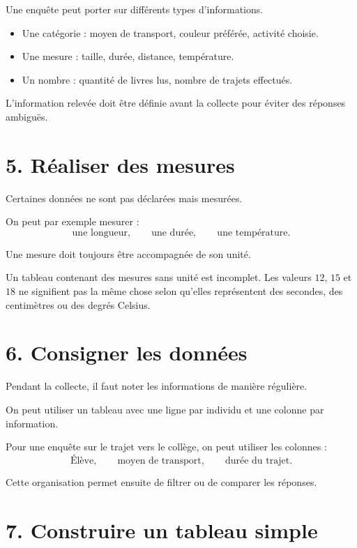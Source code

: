 Une enquête peut porter sur différents types d'informations.

\begin{itemize}
\item Une catégorie : moyen de transport, couleur préférée, activité choisie.
\item Une mesure : taille, durée, distance, température.
\item Un nombre : quantité de livres lus, nombre de trajets effectués.
\end{itemize}

L'information relevée doit être définie avant la collecte pour éviter des réponses ambiguës.

\section{5. Réaliser des mesures}

Certaines données ne sont pas déclarées mais mesurées.

On peut par exemple mesurer :
\[
\text{une longueur},\qquad
\text{une durée},\qquad
\text{une température}.
\]

Une mesure doit toujours être accompagnée de son unité.

\begin{attention}
Un tableau contenant des mesures sans unité est incomplet. Les valeurs $12$, $15$ et $18$ ne signifient pas la même chose selon qu'elles représentent des secondes, des centimètres ou des degrés Celsius.
\end{attention}

\section{6. Consigner les données}

Pendant la collecte, il faut noter les informations de manière régulière.

On peut utiliser un tableau avec une ligne par individu et une colonne par information.

\begin{exemple}
Pour une enquête sur le trajet vers le collège, on peut utiliser les colonnes :
\[
\text{Élève},\qquad
\text{moyen de transport},\qquad
\text{durée du trajet}.
\]

Cette organisation permet ensuite de filtrer ou de comparer les réponses.
\end{exemple}

\section{7. Construire un tableau simple}

